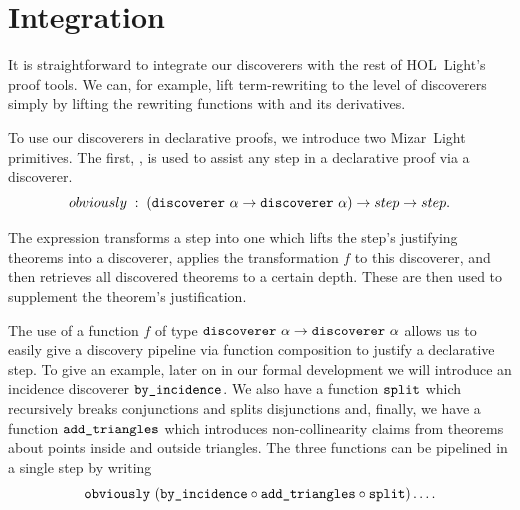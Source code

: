 
\section{Integration}
It is straightforward to integrate our discoverers with the rest of HOL~Light's proof tools. We can, for example, lift term-rewriting to the level of discoverers simply by lifting the rewriting functions with  and its derivatives. 

To use our discoverers in declarative proofs, we introduce two Mizar~Light primitives. The first, , is used to assist any step in a declarative proof via a discoverer.
\begin{displaymath}
  obviously\;:\;(\code{discoverer}\ \alpha\rightarrow\code{discoverer}\ \alpha) \rightarrow step \rightarrow step.
\end{displaymath}

The expression  transforms a step into one which lifts the step's justifying theorems into a discoverer, applies the transformation $f$ to this discoverer, and then retrieves all discovered theorems to a certain depth. These are then used to supplement the theorem's justification.

The use of a function $f$ of type $\code{discoverer}\ \alpha\rightarrow\code{discoverer}\ \alpha$ allows us to easily give a discovery pipeline via function composition to justify a declarative step. To give an example, later on in our formal development we will introduce an incidence discoverer $\texttt{by\_incidence}$. We also have a function $\texttt{split}$  which recursively breaks conjunctions and splits disjunctions and, finally, we have a function $\texttt{add\_triangles}$ which introduces non-collinearity claims from theorems about points inside and outside triangles. The three functions can be pipelined in a single step by writing
\begin{displaymath}
\code{obviously}\ (\code{by\_incidence}\circ \code{add\_triangles}\circ \code{split}) \ldots.
\end{displaymath}

